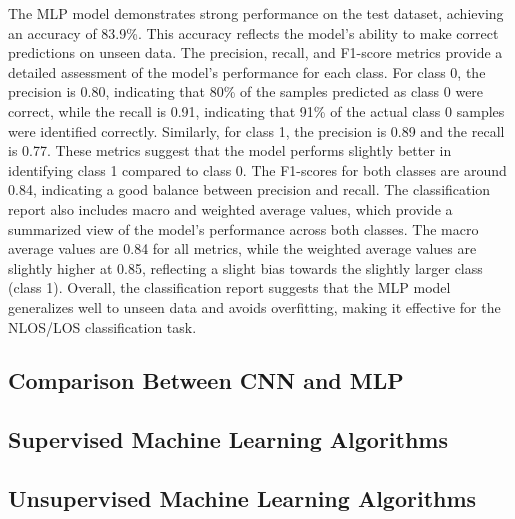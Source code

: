 \documentclass[
	article, %
	11pt, %
]{CSUniSchoolLabReport}
\begin{document}
The MLP model demonstrates strong performance on the test dataset, achieving an accuracy of 83.9\%. This accuracy reflects the model's ability to make correct predictions on unseen data. The precision, recall, and F1-score metrics provide a detailed assessment of the model's performance for each class. For class 0, the precision is 0.80, indicating that 80\% of the samples predicted as class 0 were correct, while the recall is 0.91, indicating that 91\% of the actual class 0 samples were identified correctly. Similarly, for class 1, the precision is 0.89 and the recall is 0.77. These metrics suggest that the model performs slightly better in identifying class 1 compared to class 0. The F1-scores for both classes are around 0.84, indicating a good balance between precision and recall. The classification report also includes macro and weighted average values, which provide a summarized view of the model's performance across both classes. The macro average values are 0.84 for all metrics, while the weighted average values are slightly higher at 0.85, reflecting a slight bias towards the slightly larger class (class 1). Overall, the classification report suggests that the MLP model generalizes well to unseen data and avoids overfitting, making it effective for the NLOS/LOS classification task.


\subsection{Comparison Between CNN and MLP}\label{cnn_vs_mlp}

\subsection{Supervised Machine Learning Algorithms}\label{sml}



\subsection{Unsupervised Machine Learning Algorithms}\label{uml}
\end{document}
